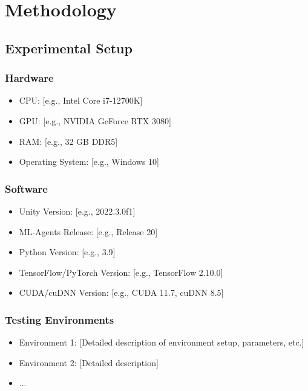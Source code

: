 \section{Methodology}

\subsection{Experimental Setup}

\subsubsection{Hardware}
\begin{itemize}
    \item CPU: [e.g., Intel Core i7-12700K]
    \item GPU: [e.g., NVIDIA GeForce RTX 3080]
    \item RAM: [e.g., 32 GB DDR5]
    \item Operating System: [e.g., Windows 10]
\end{itemize}

\subsubsection{Software}
\begin{itemize}
    \item Unity Version: [e.g., 2022.3.0f1]
    \item ML-Agents Release: [e.g., Release 20]
    \item Python Version: [e.g., 3.9]
    \item TensorFlow/PyTorch Version: [e.g., TensorFlow 2.10.0]
    \item CUDA/cuDNN Version: [e.g., CUDA 11.7, cuDNN 8.5]
\end{itemize}

\subsubsection{Testing Environments}
\begin{itemize}
    \item Environment 1: [Detailed description of environment setup, parameters, etc.]
    \item Environment 2: [Detailed description]
    \item ...
\end{itemize}

